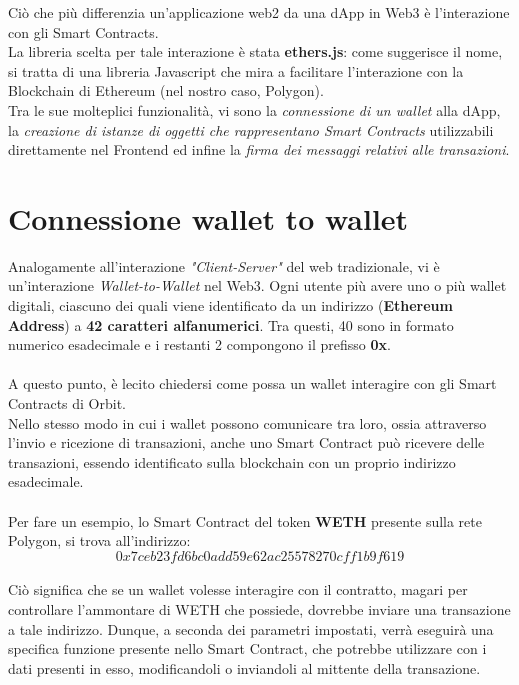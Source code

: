\documentclass[12pt,a4paper]{report}
\begin{document}
Ciò che più differenzia un'applicazione web2 da una dApp in Web3 è l'interazione con gli Smart Contracts.\\La libreria scelta per tale interazione è stata \textbf{ethers.js}\cite{ethers}: come suggerisce il nome, si tratta di una libreria Javascript che mira a facilitare l'interazione con la Blockchain di Ethereum (nel nostro caso, Polygon).
\\Tra le sue molteplici funzionalità, vi sono la \textit{connessione di un wallet} alla dApp, la \textit{creazione di istanze di oggetti che rappresentano Smart Contracts} utilizzabili direttamente nel Frontend ed infine la \textit{firma dei messaggi relativi alle transazioni}.

\section{Connessione wallet to wallet}

Analogamente all'interazione \textit{"Client-Server"} del web tradizionale, vi è un'interazione \textit{Wallet-to-Wallet} nel Web3. Ogni utente più avere uno o più wallet digitali, ciascuno dei quali viene identificato da un indirizzo (\textbf{Ethereum Address}) a \textbf{42 caratteri alfanumerici}. Tra questi, 40 sono in formato numerico esadecimale e i restanti 2 compongono il prefisso \textbf{0x}.
\\\\A questo punto, è lecito chiedersi come possa un wallet interagire con gli Smart Contracts di Orbit.\\
Nello stesso modo in cui i wallet possono comunicare tra loro, ossia attraverso l'invio e ricezione di transazioni, anche uno Smart Contract può ricevere delle transazioni, essendo identificato sulla blockchain con un proprio indirizzo esadecimale.
\\\\Per fare un esempio, lo Smart Contract del token \textbf{WETH} presente sulla rete Polygon, si trova all'indirizzo:\\
\[ 0x7ceb23fd6bc0add59e62ac25578270cff1b9f619 \]
\\Ciò significa che se un wallet volesse interagire con il contratto, magari per controllare l'ammontare di WETH che possiede, dovrebbe inviare una transazione a tale indirizzo. Dunque, a seconda dei parametri impostati, verrà eseguirà una specifica funzione presente nello Smart Contract, che potrebbe utilizzare con i dati presenti in esso, modificandoli o inviandoli al mittente della transazione.
\end{document}

